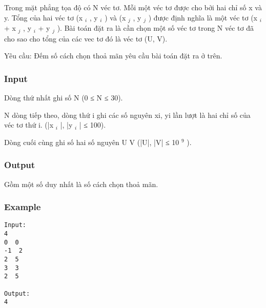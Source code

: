 



   Trong mặt phẳng tọa độ có N véc tơ. Mỗi một véc tơ được cho bởi hai chỉ số x và y. Tổng của hai véc tơ (x   $_    i   $   , y   $_    i   $   ) và (x   $_    j   $   , y   $_    j   $   ) được định nghĩa là một véc tơ (x   $_    i   $   + x   $_    j   $   , y   $_    i   $   + y   $_    j   $   ). Bài toán đặt ra là cần chọn một số véc tơ trong N véc tơ đã cho sao cho tổng của các vec tơ đó là véc tơ (U, V).  

   Yêu cầu: Đếm số cách chọn thoả mãn yêu cầu bài toán đặt ra ở trên.  

\subsubsection{   Input  }

   Dòng thứ nhất ghi số N (0 ≤ N ≤ 30).  

   N dòng tiếp theo, dòng thứ i ghi các số nguyên xi, yi lần lượt là hai chỉ số của véc tơ thứ i. (|x   $_    i   $   |, |y   $_    i   $   | ≤ 100).  

   Dòng cuối cùng ghi số hai số nguyên U V (|U|, |V| ≤ 10   $^    9   $   ).  

\subsubsection{   Output  }

   Gồm một số duy nhất là số cách chọn thoả mãn.  

\subsubsection{   Example  }
\begin{verbatim}
Input:
4
0  0
-1  2
2  5
3  3
2  5

Output:
4

\end{verbatim}